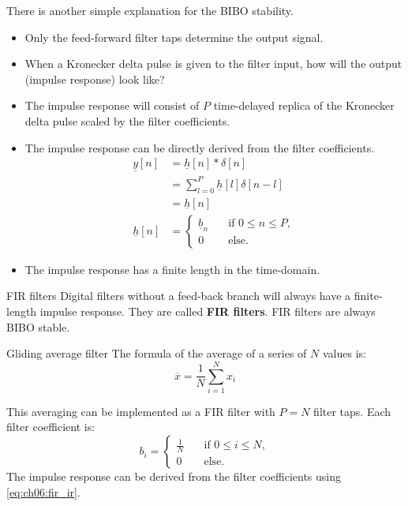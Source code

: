 \begin{refsection}
There is another simple explanation for the \ac{BIBO} stability.
\begin{itemize}
	\item Only the feed-forward filter taps determine the output signal.
	\item When a Kronecker delta pulse is given to the filter input, how will the output (impulse response) look like?
	\item The impulse response will consist of $P$ time-delayed replica of the Kronecker delta pulse scaled by the filter coefficients.
	\item The impulse response can be directly derived from the filter coefficients.
	\begin{equation}
		\begin{split}
			\underline{y}[n] &= \underline{h}[n] * \delta[n] \\
			 &= \sum\limits_{l=0}^{P} \underline{h}[l] \delta[n - l] \\
			 &= \underline{h}[n] \\
			\underline{h}[n] &= \begin{cases}
			 	\underline{b}_n &\quad \text{if } 0 \leq n \leq P, \\
			 	0 &\quad \text{else}.
			 \end{cases}
		\end{split}
		\label{eq:ch06:fir_ir}
	\end{equation}
	\item The impulse response has a finite length in the time-domain.
\end{itemize}

\begin{definition}{\ac{FIR} filters}
	Digital filters without a feed-back branch will always have a finite-length impulse response. They are called  \textbf{\acf{FIR} filters}. \ac{FIR} filters are always \ac{BIBO} stable.
\end{definition}

\begin{example}{Gliding average filter}
	The formula of the average of a series of $N$ values is:
	\begin{equation}
		\overline{x} = \frac{1}{N} \sum\limits_{i=1}^{N} x_i
	\end{equation}
	
	This averaging can be implemented as a \ac{FIR} filter with $P = N$ filter taps. Each filter coefficient is:
	\begin{equation}
		b_i = \begin{cases}
			\frac{1}{N} &\quad \text{if } 0 \leq i \leq N, \\
			0 &\quad \text{else}.
		\end{cases}
	\end{equation}
	The impulse response can be derived from the filter coefficients using \eqref{eq:ch06:fir_ir}.
	

\end{example}
\end{refsection}
